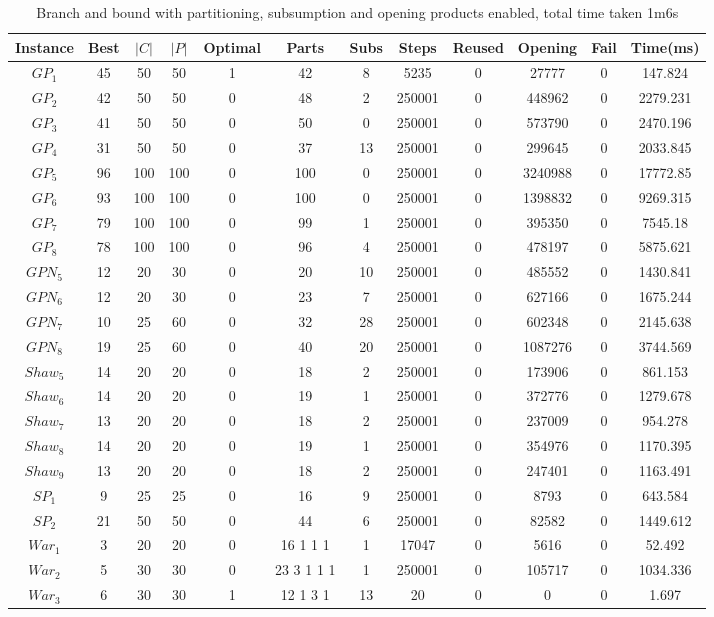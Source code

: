 \begin{table}[H]
\begin{tabular}{|c|c|c|c|c|c|c|c|c|c|c|c|} \hline
Instance&Best&$|C|$&$|P|$&Optimal&Parts&Subs&Steps&Reused&Opening&Fail&Time(ms) \\\hline
$GP_1$&45&50&50&1&42 &8&5235&0&27777&0&147.824\\ 
$GP_2$&42&50&50&0&48 &2&250001&0&448962&0&2279.231\\ 
$GP_3$&41&50&50&0&50 &0&250001&0&573790&0&2470.196\\ 
$GP_4$&31&50&50&0&37 &13&250001&0&299645&0&2033.845\\ 
$GP_5$&96&100&100&0&100 &0&250001&0&3240988&0&17772.85\\ 
$GP_6$&93&100&100&0&100 &0&250001&0&1398832&0&9269.315\\ 
$GP_7$&79&100&100&0&99 &1&250001&0&395350&0&7545.18\\ 
$GP_8$&78&100&100&0&96 &4&250001&0&478197&0&5875.621\\ 
$GPN_5$&12&20&30&0&20 &10&250001&0&485552&0&1430.841\\ 
$GPN_6$&12&20&30&0&23 &7&250001&0&627166&0&1675.244\\ 
$GPN_7$&10&25&60&0&32 &28&250001&0&602348&0&2145.638\\ 
$GPN_8$&19&25&60&0&40 &20&250001&0&1087276&0&3744.569\\ 
$Shaw_5$&14&20&20&0&18 &2&250001&0&173906&0&861.153\\ 
$Shaw_6$&14&20&20&0&19 &1&250001&0&372776&0&1279.678\\ 
$Shaw_7$&13&20&20&0&18 &2&250001&0&237009&0&954.278\\ 
$Shaw_8$&14&20&20&0&19 &1&250001&0&354976&0&1170.395\\ 
$Shaw_9$&13&20&20&0&18 &2&250001&0&247401&0&1163.491\\ 
$SP_1$&9&25&25&0&16 &9&250001&0&8793&0&643.584\\ 
$SP_2$&21&50&50&0&44 &6&250001&0&82582&0&1449.612\\ 
$War_1$&3&20&20&0&16 1 1 1 &1&17047&0&5616&0&52.492\\ 
$War_2$&5&30&30&0&23 3 1 1 1 &1&250001&0&105717&0&1034.336\\ 
$War_3$&6&30&30&1&12 1 3 1 &13&20&0&0&0&1.697\\ 
\hline
\end{tabular}
\caption{ Branch and bound with partitioning, subsumption and opening products enabled, total time taken 1m6s }
\end{table}



